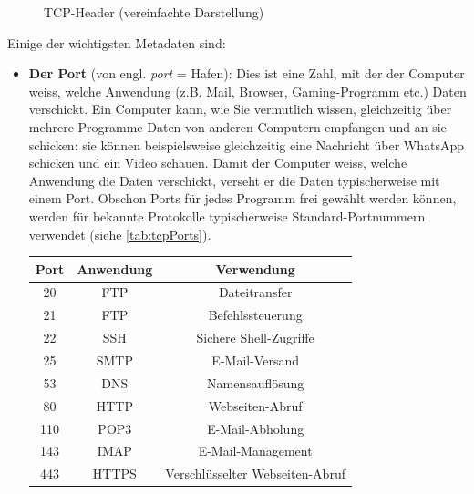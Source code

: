 \begin{figure}[H]
	\centering
	
	\caption{\gls{TCP}-Header (vereinfachte Darstellung)}
	\label{fig:tcp-header}
\end{figure}


Einige der wichtigsten Metadaten sind:

\begin{itemize}
	\item \textbf{Der Port} (von engl. \textit{port} = Hafen): Dies ist eine Zahl, mit der der Computer weiss, welche Anwendung (z.B. Mail, Browser, Gaming-Programm etc.) Daten verschickt. Ein Computer kann, wie Sie vermutlich wissen, gleichzeitig über mehrere Programme Daten von anderen Computern empfangen und an sie schicken: sie können beispielsweise gleichzeitig eine Nachricht über WhatsApp schicken und ein Video schauen. Damit der Computer weiss, welche Anwendung die Daten verschickt, verseht er die Daten typischerweise mit einem Port. Obschon Ports für jedes Programm frei gewählt werden können, werden für bekannte Protokolle typischerweise Standard-Portnummern verwendet (siehe \cref{tab:tcpPorts}).
	      \begin{table}[H]
		      \centering
		      \begin{tabular}{c||c|c}
			      \toprule
			      \textbf{Port} & \textbf{Anwendung} & \textbf{Verwendung}                   \\
			      \midrule
			      20            & \acrfull{FTP}      & Dateitransfer                         \\
			      21            & \acrfull{FTP}      & Befehlssteuerung                      \\
			      22            & \acrfull{SSH}      & Sichere Shell-Zugriffe                \\
			      25            & \acrfull{SMTP}     & E-Mail-Versand                        \\
			      53            & \acrfull{DNS}      & Namensauflösung                       \\
			      80            & \acrfull{HTTP}     & Webseiten-Abruf                       \\
			      110           & \acrfull{POP3}     & E-Mail-Abholung                       \\
			      143           & \acrfull{IMAP}     & E-Mail-Management                     \\
			      443           & \acrfull{HTTPS}    & Verschlüsselter Webseiten-Abruf       \\

\end{tabular}
\end{table}
\end{itemize}
